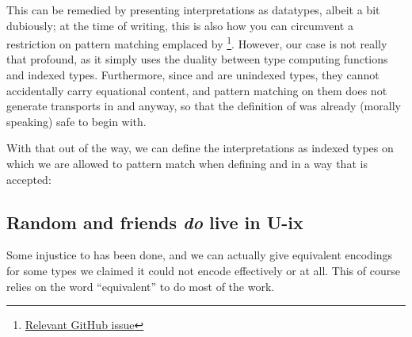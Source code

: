 \begin{appendix}
This can be remedied by presenting interpretations as datatypes, albeit a bit dubiously; at the time of writing, this is also how you can circumvent a restriction on pattern matching emplaced by \footnote{\href{https://github.com/agda/agda/issues/5910\#issuecomment-1601301237}{Relevant GitHub issue}}. However, our case is not really that profound, as it simply uses the duality between type computing functions and indexed types. Furthermore, since  and  are unindexed types, they cannot accidentally carry equational content, and pattern matching on them does not generate transports in  and  anyway, so that the definition of  was already (morally speaking) safe to begin with.

With that out of the way, we can define the interpretations as indexed types
on which we are allowed to pattern match when defining  and  in a way that is accepted:


\subsection{Random and friends \textit{do} live in U-ix}\label{app:unnested}
Some injustice to  has been done, and we can actually give equivalent encodings for some types we claimed it could not encode effectively or at all. This of course relies on the word ``equivalent'' to do most of the work. 



\begin{comment}
Use \AF{power} and indices.

Can still do an encoding of rosetrees.

\todo{write me}

\begin{outline}
Kun je aannemelijk maken dat er geen dependently typed encoding bestaat van Finger Trees? Voor binary random access lijsten, perfect trees, en lambda termen bestaan die wel... Of is de constructie te omslachtig?
\end{outline}

\subsection{Index-first}

\subsection{Sigma descriptions}\label{app:large-sigma}
\autoref{app:withoutk}


\end{comment}
\end{appendix}
